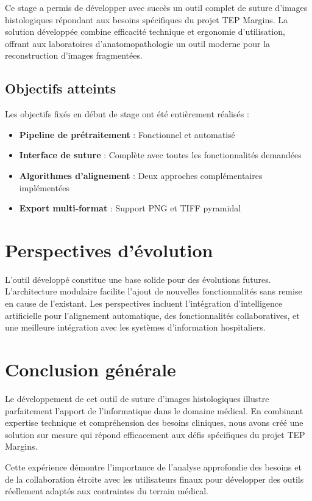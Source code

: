\documentclass[12pt,a4paper]{report}
\begin{document}
Ce stage a permis de développer avec succès un outil complet de suture d'images histologiques répondant aux besoins spécifiques du projet TEP Margins. La solution développée combine efficacité technique et ergonomie d'utilisation, offrant aux laboratoires d'anatomopathologie un outil moderne pour la reconstruction d'images fragmentées.

\subsection{Objectifs atteints}

Les objectifs fixés en début de stage ont été entièrement réalisés :
\begin{itemize}
\item \textbf{Pipeline de prétraitement} : Fonctionnel et automatisé
\item \textbf{Interface de suture} : Complète avec toutes les fonctionnalités demandées
\item \textbf{Algorithmes d'alignement} : Deux approches complémentaires implémentées
\item \textbf{Export multi-format} : Support PNG et TIFF pyramidal
\end{itemize}

\section{Perspectives d'évolution}

L'outil développé constitue une base solide pour des évolutions futures. L'architecture modulaire facilite l'ajout de nouvelles fonctionnalités sans remise en cause de l'existant. Les perspectives incluent l'intégration d'intelligence artificielle pour l'alignement automatique, des fonctionnalités collaboratives, et une meilleure intégration avec les systèmes d'information hospitaliers.

\section{Conclusion générale}

Le développement de cet outil de suture d'images histologiques illustre parfaitement l'apport de l'informatique dans le domaine médical. En combinant expertise technique et compréhension des besoins cliniques, nous avons créé une solution sur mesure qui répond efficacement aux défis spécifiques du projet TEP Margins.

Cette expérience démontre l'importance de l'analyse approfondie des besoins et de la collaboration étroite avec les utilisateurs finaux pour développer des outils réellement adaptés aux contraintes du terrain médical.
\end{document}
